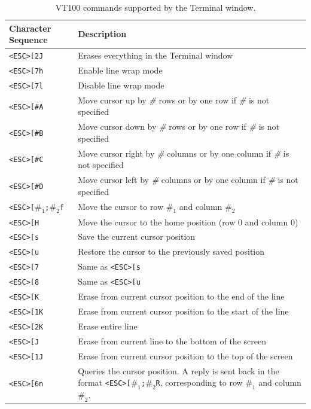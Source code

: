 \documentclass[11pt, twoside, pdftex]{article}
\begin{document}
\begin{table}[H]
    \centering
    \begin{tabular}{|l|p{4in}|}
        \hline
        Character Sequence&Description\\
        \hline
        \hline
        \texttt{<ESC>[2J}&Erases everything in the Terminal window\\
        \hline
        \texttt{<ESC>[7h}&Enable line wrap mode\\
        \hline
        \texttt{<ESC>[7l}&Disable line wrap mode\\
        \hline
        \texttt{<ESC>[\emph{\#}A}&Move cursor up by \emph{\#} rows or by one row if \emph{\#} is not specified\\
        \hline
        \texttt{<ESC>[\emph{\#}B}&Move cursor down by \emph{\#} rows or by one row if \emph{\#} is not specified\\
        \hline
        \texttt{<ESC>[\emph{\#}C}&Move cursor right by \emph{\#} columns or by one column if \emph{\#} is not specified\\
        \hline
        \texttt{<ESC>[\emph{\#}D}&Move cursor left by \emph{\#} columns or by one column if \emph{\#} is not specified\\
        \hline
        \texttt{<ESC>[\emph{$\#_1$};\emph{$\#_2$}f}&Move the cursor to row \emph{$\#_1$} and column \emph{$\#_2$}\\
        \hline
        \texttt{<ESC>[H}&Move the cursor to the home position (row 0 and column 0)\\
        \hline
        \texttt{<ESC>[s}&Save the current cursor position\\
        \hline
        \texttt{<ESC>[u}&Restore the cursor to the previously saved position\\
        \hline
        \texttt{<ESC>[7}&Same as \texttt{<ESC>[s}\\
        \hline
        \texttt{<ESC>[8}&Same as \texttt{<ESC>[u}\\
        \hline
        \texttt{<ESC>[K}&Erase from current cursor position to the end of the line\\
        \hline
        \texttt{<ESC>[1K}&Erase from current cursor position to the start of the line\\
        \hline
        \texttt{<ESC>[2K}&Erase entire line\\
        \hline
        \texttt{<ESC>[J}&Erase from current line to the bottom of the screen\\
        \hline
        \texttt{<ESC>[1J}&Erase from current cursor position to the top of the screen\\
        \hline
        \texttt{<ESC>[6n}&Queries the cursor position. A reply is sent back in the format \texttt{<ESC>[\emph{$\#_1$};\emph{$\#_2$}R},
            corresponding to row \emph{$\#_1$} and column \emph{$\#_2$}.\\
        \hline
    \end{tabular}
    \caption{VT100 commands supported by the Terminal window.} 
		\label{tbl:1}

\end{table}
\end{document}
